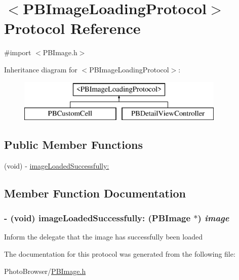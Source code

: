 \hypertarget{protocol_p_b_image_loading_protocol-p}{
\section{$<$PBImageLoadingProtocol$>$ Protocol Reference}
\label{protocol_p_b_image_loading_protocol-p}
}


{\ttfamily \#import $<$PBImage.h$>$}

Inheritance diagram for $<$PBImageLoadingProtocol$>$:\begin{figure}[H]
\begin{center}
\leavevmode
\includegraphics[height=2cm]{protocol_p_b_image_loading_protocol-p}
\end{center}
\end{figure}
\subsection*{Public Member Functions}
\begin{DoxyCompactItemize}
\item 
(void) -\/ \hyperlink{protocol_p_b_image_loading_protocol-p_a9c31e843d0ed080816f7b9c1a657bd72}{imageLoadedSuccessfully:}
\end{DoxyCompactItemize}


\subsection{Member Function Documentation}
\hypertarget{protocol_p_b_image_loading_protocol-p_a9c31e843d0ed080816f7b9c1a657bd72}{
\subsubsection[{imageLoadedSuccessfully:}]{\setlength{\rightskip}{0pt plus 5cm}-\/ (void) imageLoadedSuccessfully: ({\bf PBImage} $\ast$) {\em image}}}
\label{protocol_p_b_image_loading_protocol-p_a9c31e843d0ed080816f7b9c1a657bd72}
Inform the delegate that the image has successfully been loaded 

The documentation for this protocol was generated from the following file:\begin{DoxyCompactItemize}
\item 
PhotoBrowser/\hyperlink{_p_b_image_8h}{PBImage.h}\end{DoxyCompactItemize}
